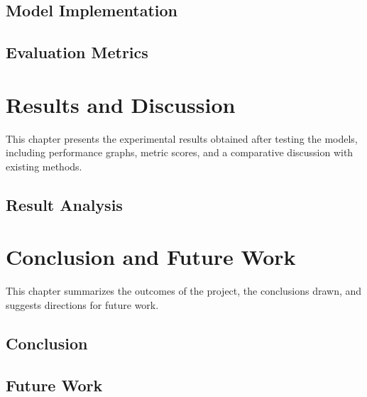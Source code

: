 \documentclass[12pt]{report}
\begin{document}
\section{Model Implementation}

\section{Evaluation Metrics}

\newpage

\chapter{Results and Discussion}

This chapter presents the experimental results obtained after testing the models,
including performance graphs, metric scores, and a comparative discussion with existing
methods.

\section{Result Analysis}

\newpage

\chapter{Conclusion and Future Work}

This chapter summarizes the outcomes of the project, the conclusions drawn, and suggests
directions for future work.

\section{Conclusion}

\section{Future Work}

\newpage
\end{document}
